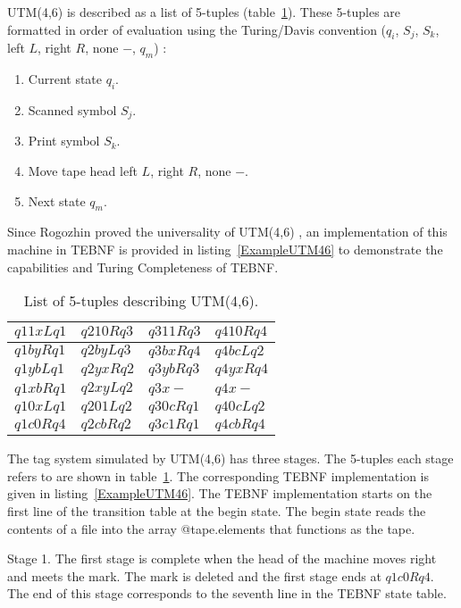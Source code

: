 \indent
UTM(4,6) \cite{rogozhin_01} is described as a list of 5-tuples (table~\ref{FiveTuples}).  These 5-tuples are formatted in order of evaluation using the Turing/Davis convention ($q_i$, $S_j$, $S_k$, left $L$, right $R$, none $-$, $q_m$) \cite{kumar_01}:
\begin{enumerate}
  \item Current state $q_i$.
  \item Scanned symbol $S_j$.
  \item Print symbol $S_k$.
  \item Move tape head left $L$, right $R$, none $-$.
  \item Next state $q_m$.
\end{enumerate}

\indent
Since Rogozhin proved the universality of UTM(4,6) \cite{rogozhin_01}, an implementation of this machine in TEBNF is provided in listing~\ref{ExampleUTM46} to demonstrate the capabilities and Turing Completeness of TEBNF.

\begin{table}[h]
\begin{center}
\caption{List of 5-tuples describing UTM(4,6).}
\label{FiveTuples}
\begin{tabular}{|l|l|l|l|} \hline
$q11xLq1$ & $q210Rq3$ & $q311Rq3$ & $q410Rq4$ \\ \hline
$q1byRq1$ & $q2byLq3$ & $q3bxRq4$ & $q4bcLq2$ \\ \hline
$q1ybLq1$ & $q2yxRq2$ & $q3ybRq3$ & $q4yxRq4$ \\ \hline
$q1xbRq1$ & $q2xyLq2$ & $q3x-$    & $q4x-   $ \\ \hline
$q10xLq1$ & $q201Lq2$ & $q30cRq1$ & $q40cLq2$ \\ \hline
$q1c0Rq4$ & $q2cbRq2$ & $q3c1Rq1$ & $q4cbRq4$ \\ \hline
\end{tabular}
\end{center}
\end{table}

The tag system simulated by UTM(4,6) \cite{rogozhin_01} has three stages.  The 5-tuples each stage refers to are shown in table~\ref{FiveTuples}.  The corresponding TEBNF implementation is given in listing~\ref{ExampleUTM46}. The TEBNF implementation starts on the first line of the transition table at the begin state.  The begin state reads the contents of a file into the array @tape.elements that functions as the tape.

\indent
Stage 1.  The first stage is complete when the head of the machine moves right and meets the mark.  The mark is deleted and the first stage ends at $q1c0Rq4$.  The end of this stage corresponds to the seventh line in the TEBNF state table.

